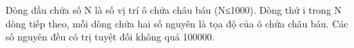 Dòng đầu chứa số N là số vị trí ô chứa châu báu (N≤1000). Dòng thứ i trong N dòng tiếp theo, mỗi dòng chứa hai số nguyên là tọa độ của ô chứa châu báu. Các số nguyên đều có trị tuyệt đối không quá 100000.